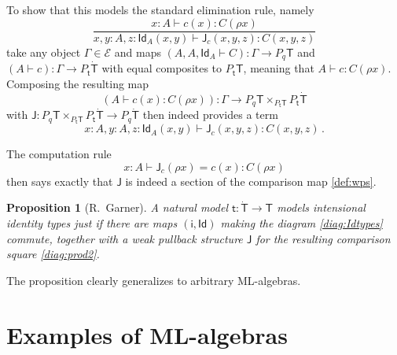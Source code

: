 \documentclass[12pt,reqno]{amsart}
\newcommand{\ednote}[1]{[\textit{\color{red}{#1}}]} %
\newcommand{\EE}{\ensuremath{\mathcal{E}}}
\renewcommand{\to}{\ensuremath{\rightarrow}}
\newcommand{\Id}{\mathsf{Id}}
\renewcommand{\t}{\ensuremath{\mathsf{t}}}
\newcommand{\T}{\ensuremath{\mathsf{T}}}
\newcommand{\TT}{\ensuremath{\dot{\mathsf{T}}}}
\newtheorem{proposition}[theorem]{Proposition}
\theoremstyle{remark}
\theoremstyle{definition}
\begin{document}
To show that this models the standard elimination rule, namely
\[
\frac{x:A\vdash c(x) : C(\rho x)}{x, y:A, z : \Id_A(x, y)\vdash \mathsf{J}_c(x,y,z) : C(x,y,z)}
\]
take any object $\Gamma \in \EE$  and maps $(A, A, \Id_{A} \vdash C) : \Gamma \to P_q\T$ and $(A \vdash c) : \Gamma \to P_\t\TT$ with equal composites to $P_\t\T$, meaning that $A \vdash c : C(\rho x)$.  Composing the resulting map 
\[
(A\vdash c(x):C(\rho x)) : \Gamma \to P_q\T \times_{P_\t\T} P_\t\TT
\]
with $\mathsf{J} : P_q\T \times_{P_\t\T} P_\t\TT \to P_q \TT$ then indeed provides a term $$x:A, y:A, z:\Id_{A}(x,y)  \vdash \mathsf{J}_c(x,y,z) : C(x,y,z)\,.$$

The computation rule
\[
x: A \vdash \mathsf{J}_c(\rho x) = c(x) : C(\rho x)
\]
then says exactly that $\mathsf{J}$ is indeed a section of the comparison map \eqref{def:wps}.

\begin{proposition}[R.\ Garner] A natural model $\t : \TT \to \T$ models intensional \emph{identity types} just if there are maps $(\mathsf{i}, \Id)$ making the diagram \eqref{diag:Idtypes} commute, together with a weak pullback structure $\mathsf{J}$ for the resulting comparison square \eqref{diag:prod2}.
\end{proposition}

The proposition clearly generalizes to arbitrary ML-algebras.

\section{Examples of ML-algebras}%
\end{document}
